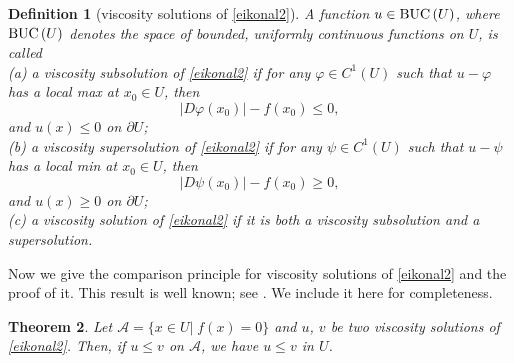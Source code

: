 \documentclass[12pt,reqno]{amsart}
\numberwithin{figure}{section}
\theoremstyle{plain}
\newtheorem{defn}{Definition}[section]
\newtheorem{thm}[defn]{Theorem}
\numberwithin{equation}{section}
\newcommand{\BUC}{{\rm BUC\,}}
\begin{document}
\begin{defn}[viscosity solutions of \eqref{eikonal2}]
A function $u \in \BUC(U)$, where $\BUC(U)$ denotes the space of bounded, uniformly continuous functions on $U$, is called \\
(a) a viscosity subsolution of \eqref{eikonal2} if for any $\varphi\in C^1(U)$ such that $u-\varphi$ has a local max at $x_0\in U$, then 
\[
|D\varphi(x_0)|-f(x_0) \le 0, 
\]
and $u(x)\le0 $ on $\partial U$;\\
(b) a viscosity supersolution of \eqref{eikonal2} if for any $\psi \in C^1(U)$ such that $u-\psi$ has a local min at $x_0\in U$, then 
\[
|D\psi(x_0)|-f(x_0)\ge 0,
\]
and $u(x)\ge 0$ on $\partial U$;\\
(c) a viscosity solution of \eqref{eikonal2} if it is both a viscosity subsolution and a supersolution.
\end{defn}
Now we give the comparison principle for viscosity solutions of  \eqref{eikonal2} and the proof of it. This result is well known; see \cite{LeMitakeTran2017}. We include it here for completeness.
\begin{thm}
    Let $\mathcal{A}=\{x\in U| \;f(x)=0\}$ and $u$, $v$ be two viscosity solutions of \eqref{eikonal2}. Then, if $u\le v$ on $\mathcal{A}$, we have $u\le v$ in $U$.
\end{thm}
\end{document}
